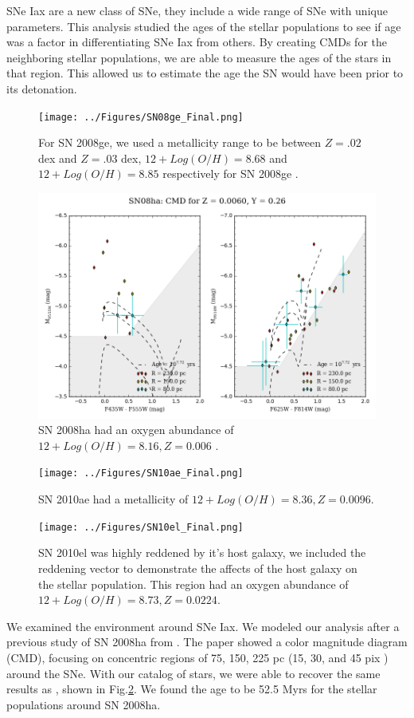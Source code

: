 \documentclass[preprint]{aastex}
\begin{document}
SNe Iax are a new class of SNe, they include a wide range of SNe with unique parameters.
This analysis studied the ages of the stellar populations to see if age was 
a factor in differentiating SNe Iax from others. 
By creating CMDs for the neighboring stellar populations,
we are able to measure the ages of the stars in that region. 
This allowed us to estimate the age the SN would have been prior to its detonation. 
\begin{figure}[p]
	\centering
	\texttt{[image: ../Figures/SN08ge\_Final.png]}
	\caption{For SN 2008ge, we used a metallicity range to be between $Z = .02$ dex and $Z = .03$ dex, 
	$12 + Log(O/H) = 8.68$  and $12 + Log(O/H) = 8.85$ respectively for SN 2008ge  \citep{pro11}. }
    	\label{fig:08geCMD}
\end{figure}
\begin{figure}[p]
	\centering
	\includegraphics[scale=0.5]{../Figures/SN08ha_Final.png}
	\caption{SN 2008ha had an oxygen abundance of $ 12 + Log(O/H) = 8.16, Z = 0.006$ \citep{fol09,tak95}.}
    	\label{fig:08haCMD}
\end{figure}
\begin{figure}[p]
	\centering
	\texttt{[image: ../Figures/SN10ae\_Final.png]}
	\caption{SN 2010ae had a metallicity of $ 12 + Log(O/H) = 8.36, Z = 0.0096$. }
    	\label{fig:10aeCMD}
\end{figure}
\begin{figure}[p]
	\centering
	\texttt{[image: ../Figures/SN10el\_Final.png]}
	\caption{ SN 2010el was highly reddened by it's host galaxy, we included the reddening vector 
	to demonstrate the affects of the host galaxy on the stellar population. 
	This region had an oxygen abundance of $ 12 + Log(O/H) = 8.73, Z = 0.0224.$}
    	\label{fig:10elCMD}
\end{figure}
We examined the environment around SNe Iax. 
We modeled our analysis after a previous study of SN 2008ha from \citet{fol1409}. 
The \citet{fol1409} paper showed a color magnitude diagram (CMD), focusing on 
concentric regions of 75, 150, 225 pc (15, 30, and 45 pix ) around the SNe. 
With our catalog of stars, we were able to recover the same
results as \citet{fol1409}, shown in Fig.\ref{fig:08haCMD}.
We found the age to be 52.5 Myrs for the 
stellar populations around SN 2008ha. 
\end{document}
